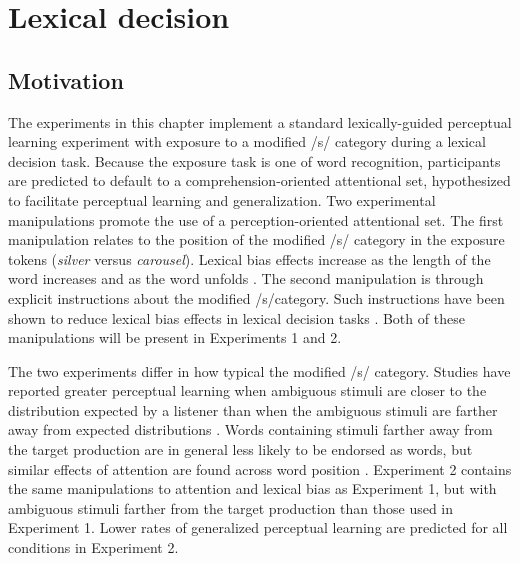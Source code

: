 
\chapter{Lexical decision}
\label{chap:lexdec}

\section{Motivation}

The experiments in this chapter implement a standard lexically-guided perceptual learning experiment with exposure to a modified /s/ category during a lexical decision task.
Because the exposure task is one of word recognition, participants are predicted to default to a comprehension-oriented attentional set, hypothesized to facilitate perceptual learning and generalization.
Two experimental manipulations promote the use of  a perception-oriented attentional set.
The first manipulation relates to the position of the modified /s/ category in the exposure tokens (\emph{silver} versus \emph{carousel}).
Lexical bias effects increase as the length of the word increases and as the word unfolds \citep{Pitt2006, Pitt2012}.
The second manipulation is through explicit instructions about the modified /s/category.
Such instructions have been shown to reduce lexical bias effects in lexical decision tasks \citep{Pitt2012}.
Both of these manipulations will be present in Experiments 1 and 2.

The two experiments differ in how typical the modified /s/ category.
Studies have reported greater perceptual learning when ambiguous stimuli are closer to the distribution expected by a listener than when the ambiguous stimuli are farther away from expected distributions \citep{Sumner2011}.  
Words containing stimuli farther away from the target production are in general less likely to be endorsed as words, but similar effects of attention are found across word position \citep{Pitt2012}.  
Experiment 2 contains the same manipulations to attention and lexical bias as Experiment 1, but with ambiguous stimuli farther from the target production than those used in Experiment 1.
Lower rates of generalized perceptual learning are predicted for all conditions in Experiment 2.

